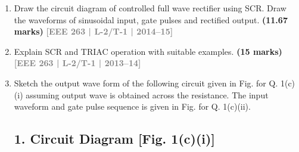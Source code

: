 \documentclass[12pt,a3paper]{article}
\newcommand{\yr}[1]{\hfill\textcolor{gray}{\small\textbf{[#1]}}}
\newcommand{\mk}[1]{\textcolor{orange!70!black}{\small\textbf{(#1 marks)}}}
\begin{document}
\begin{enumerate}\item  Draw the circuit diagram of controlled full wave rectifier using SCR. Draw the waveforms of sinusoidal input, gate pulses and rectified output.
\mk{11.67} \yr{EEE 263 | L-2/T-1 | 2014--15}

\item Explain SCR and TRIAC operation with suitable examples.
\mk{15} \yr{EEE 263 | L-2/T-1 | 2013--14}

\item Sketch the output wave form of the following circuit given in Fig. for Q. 1(c)(i) assuming output wave is obtained across the resistance. The input waveform and gate pulse sequence is given in Fig. for Q. 1(c)(ii). 


\subsection*{1. Circuit Diagram [Fig. 1(c)(i)]}
\begin{center}
\end{center}



\end{enumerate}
\end{document}
